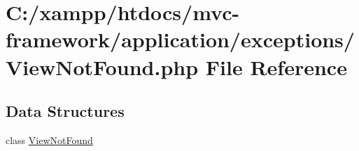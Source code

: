 \hypertarget{_view_not_found_8php}{}\section{C\+:/xampp/htdocs/mvc-\/framework/application/exceptions/\+View\+Not\+Found.php File Reference}
\label{_view_not_found_8php}
\subsection*{Data Structures}
\begin{DoxyCompactItemize}
\item 
class \hyperlink{class_view_not_found}{View\+Not\+Found}
\end{DoxyCompactItemize}
